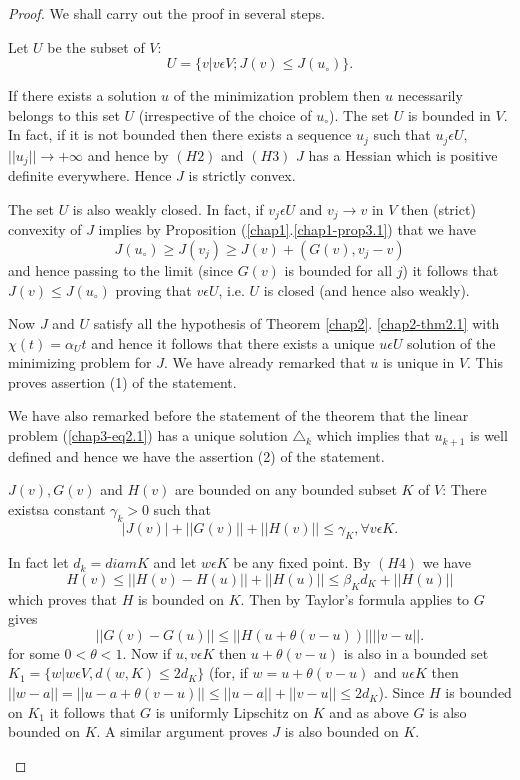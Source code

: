 \begin{proof}
We shall carry out the proof in several steps.
\begin{step}%
Let $U$ be the subset of $V$:
$$
U = \{v | v \epsilon V; J(v) \leq J(u_{\circ})\}.
$$

If there exists a solution $u$ of the minimization problem then $u$ necessarily belongs to this set $U$ (irrespective of the choice of $u_{\circ}$). The set $U$ is bounded in $V$. In fact, if it is not bounded then there exists a sequence $u_{j}$ such that $u_{j} \epsilon U$, $||u_{j}|| \to + \infty$ and hence by $(H2)$ and $(H3)$ $J$ has a Hessian which is positive definite everywhere. Hence $J$ is strictly convex.

The set $U$ is also weakly closed. In fact, if $v_{j} \epsilon U$ and $v_{j} \to v$ in $V$ then (strict) convexity of $J$ implies by Proposition (\ref{chap1}.\ref{chap1-prop3.1}) that we have
$$
J(u_{\circ}) \geq J(v_{j}) \geq J(v) + (G(v), v_{j}-v)
$$
and hence passing to the limit (since $G(v)$ is bounded for all $j$) it follows that $J(v) \leq J(u_{\circ})$ proving that $v \epsilon U$, i.e. $U$ is closed (and hence also weakly).

Now $J$ and $U$ satisfy all the hypothesis of Theorem \ref{chap2}. \ref{chap2-thm2.1} with $\chi(t) = \alpha_{U} t$ and hence it follows that there exists a unique $u \epsilon U$ solution of the minimizing problem for $J$. We have already remarked that $u$ is unique in $V$. This proves assertion (1) of the statement.

We have also remarked before the statement of the theorem that the linear problem (\ref{chap3-eq2.1}) has a unique solution $\triangle_{k}$ which implies that $u_{k+1}$ is well defined and hence we have the assertion (2) of the statement.
\end{step}

\begin{step}%
$J(v), G(v)$ and $H(v)$ are bounded on any bounded subset $K$ of $V$: There exists\pageoriginale a constant $\gamma_{k} > 0$ such that
$$
|J(v)| + ||G(v)|| + ||H(v)|| \leq \gamma_{K}, \forall v \epsilon K.
$$

In fact let $d_{k} = diam K$ and let $w \epsilon K$ be any fixed point. By $(H4)$ we have
$$
H(v) \leq ||H(v) - H(u)|| + ||H(u)|| \leq \beta_{K} d_{K} + ||H(u)||
$$  
which proves that $H$ is bounded on $K$. Then by Taylor's formula applies to $G$ gives
$$
||G(v) - G(u)|| \leq ||H(u+\theta (v-u))|| ||v-u||.
$$
for some $0 < \theta < 1$. Now if $u, v \epsilon K$ then $u+\theta(v-u)$ is also in a bounded set $K_{1} = \{w | w \epsilon V, d(w, K) \leq 2d_{K}\}$ (for, if $w = u + \theta(v-u)$ and $u \epsilon K$ then $||w-a|| = ||u-a+\theta(v-u)|| \leq ||u-a|| + ||v-u|| \leq 2d_{K}$). Since $H$ is bounded on $K_{1}$ it follows that $G$ is uniformly Lipschitz on $K$ and as above $G$ is also bounded on $K$. A similar argument proves $J$ is also bounded on $K$.


\end{step}
\end{proof}
